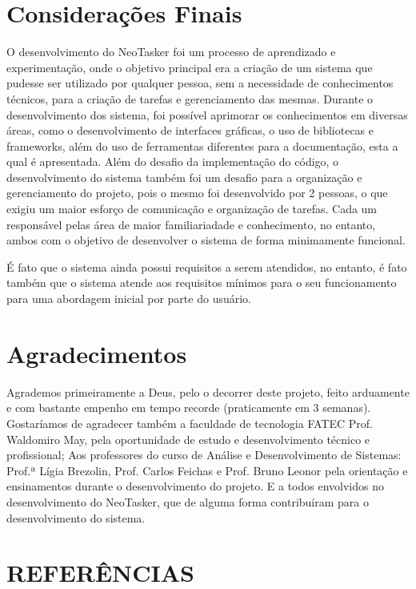 \documentclass[a4paper,12pt]{article}
\begin{document}
\section{Considerações Finais}
O desenvolvimento do NeoTasker foi um processo de aprendizado e experimentação, onde o objetivo principal era a criação de um sistema que pudesse ser utilizado
por qualquer pessoa, sem a necessidade de conhecimentos técnicos, para a criação de tarefas e gerenciamento das mesmas. Durante o desenvolvimento dos sistema,
foi possível aprimorar os conhecimentos em diversas áreas, como o desenvolvimento de interfaces gráficas, o uso de bibliotecas e frameworks, além do uso de ferramentas 
diferentes para a documentação, esta a qual é apresentada. Além do desafio da implementação do código, o desenvolvimento do sistema também foi um desafio para a 
organização e gerenciamento do projeto, pois o mesmo foi desenvolvido por 2 pessoas, o que exigiu um maior esforço de comunicação e organização de tarefas. Cada um responsável 
pelas área de maior familiariadade e conhecimento, no entanto, ambos com o objetivo de desenvolver o sistema de forma minimamente funcional. 

É fato que o sistema ainda possui requisitos a serem atendidos, no entanto, é fato também que o sistema atende aos requisitos mínimos para o seu funcionamento para 
uma abordagem inicial por parte do usuário.

\pagebreak
\section{Agradecimentos}
Agrademos primeiramente a Deus, pelo o decorrer deste projeto, feito arduamente e com bastante empenho em tempo recorde (praticamente em 3 semanas). Gostaríamos de 
agradecer também a faculdade de tecnologia FATEC Prof. Waldomiro May, pela oportunidade de estudo e desenvolvimento técnico e profissional; Aos professores do curso de
Análise e Desenvolvimento de Sistemas: Prof.ª Lígia Brezolin, Prof. Carlos Feichas e Prof. Bruno Leonor pela orientação e ensinamentos durante o desenvolvimento do projeto.
E a todos envolvidos no desenvolvimento do NeoTasker, que de alguma forma contribuíram para o desenvolvimento do sistema.

\pagebreak
\centering \section*{REFERÊNCIAS}
\vspace{1cm}
\end{document}
